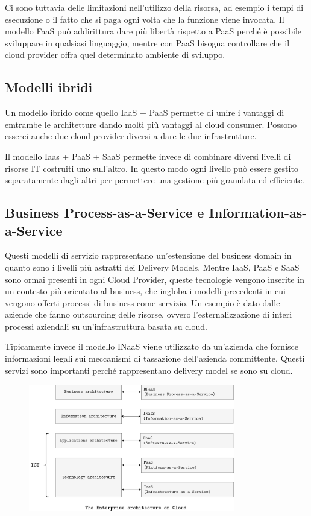 Ci sono tuttavia delle limitazioni nell'utilizzo della risorsa, ad esempio i tempi di esecuzione o il fatto che si paga ogni volta che la funzione viene invocata. Il modello FaaS può addirittura dare più libertà rispetto a PaaS perché è possibile sviluppare in qualsiasi linguaggio, mentre con PaaS bisogna controllare che il cloud provider offra quel determinato ambiente di sviluppo.

\subsection{Modelli ibridi}
Un modello ibrido come quello IaaS + PaaS  permette di unire i vantaggi di emtrambe le architetture dando molti più vantaggi al cloud consumer. Possono esserci anche due cloud provider diversi a dare le due infrastrutture.

Il modello Iaas + PaaS + SaaS permette invece di combinare diversi livelli di risorse IT costruiti uno sull'altro. In questo modo ogni livello può essere gestito separatamente dagli altri per permettere una gestione più granulata ed efficiente.

\subsection{Business Process-as-a-Service e Information-as-a-Service}
Questi modelli di servizio rappresentano un'estensione del business domain in quanto sono i livelli più astratti dei Delivery Models. Mentre IaaS, PaaS e SaaS sono ormai presenti in ogni Cloud Provider, queste tecnologie vengono inserite in un contesto più orientato al business, che ingloba i modelli precedenti in cui vengono offerti processi di business come servizio. Un esempio è dato dalle aziende che fanno outsourcing delle risorse, ovvero l'esternalizzazione di interi processi aziendali su un'infrastruttura basata su cloud. 

\vspace{5mm}
Tipicamente invece il modello INaaS viene utilizzato da un'azienda che fornisce informazioni legali sui meccanismi di tassazione dell'azienda committente. Questi servizi sono importanti perché rappresentano delivery model se sono su cloud.

\begin{figure}[ht]
    \centering
    \includegraphics[width=9cm]{./Images/cap3/3.5.png}
    \label{fig:image3.5}
\end{figure}
\newpage
